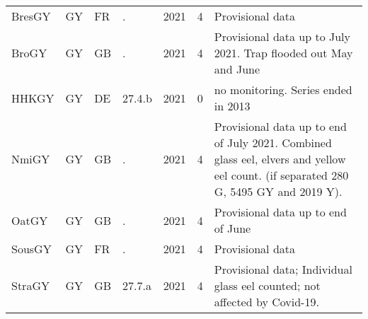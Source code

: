 \begin{table}[htbp]
\begin{tabular}{p{1.5cm}p{1.5cm}p{1.5cm}p{1cm}p{1cm}p{1cm}p{8cm}}
  BresGY & GY & FR & . & 2021 &   4 & Provisional data \\ 
  BroGY & GY & GB & . & 2021 &   4 & Provisional data up to July 2021. Trap flooded out May and June \\ 
  HHKGY & GY & DE & 27.4.b & 2021 &   0 & no monitoring. Series ended in 2013 \\ 
  NmiGY & GY & GB & . & 2021 &   4 & Provisional data up to end of July 2021. Combined glass eel, elvers and yellow eel count. (if separated 280 G, 5495 GY and 2019 Y). \\ 
  OatGY & GY & GB & . & 2021 &   4 & Provisional data up to end of June \\ 
  SousGY & GY & FR & . & 2021 &   4 & Provisional data \\ 
  StraGY & GY & GB & 27.7.a & 2021 &   4 & Provisional data; Individual glass eel counted; not affected by Covid-19. \\ 
   \hline
\end{tabular}
\end{table}
